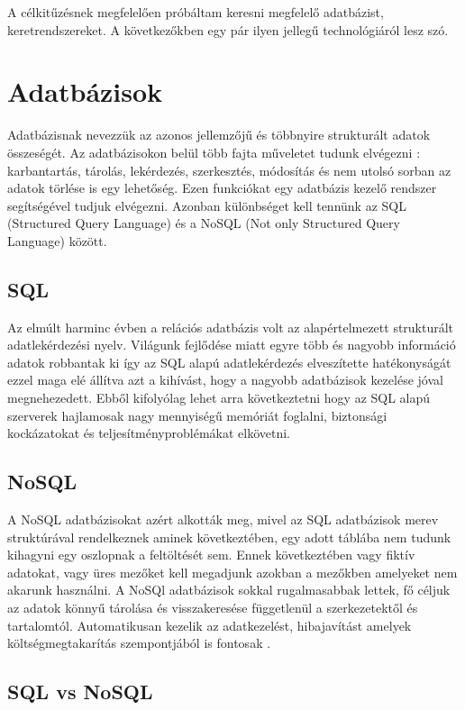A célkitűzésnek megfelelően próbáltam keresni megfelelő adatbázist, keretrendszereket. A következőkben egy pár ilyen jellegű technológiáról lesz szó.
\section{Adatbázisok}
Adatbázisnak nevezzük az azonos jellemzőjű és többnyire strukturált adatok összeségét. Az adatbázisokon belül több fajta műveletet tudunk elvégezni \cite{dbms}: karbantartás, tárolás, lekérdezés, szerkesztés, módosítás és nem utolsó sorban az adatok törlése is egy lehetőség. Ezen funkciókat egy adatbázis kezelő rendszer segítségével tudjuk elvégezni. Azonban különbséget kell tennünk az SQL (Structured Query Language) és a NoSQL (Not only Structured Query Language) között.
\subsection{SQL}

Az elmúlt harminc évben a relációs adatbázis volt az alapértelmezett strukturált adatlekérdezési nyelv. Világunk fejlődése miatt egyre több és nagyobb információ adatok robbantak ki így az SQL alapú adatlekérdezés \cite{venkatraman2016sql}  elveszítette hatékonyságát ezzel maga elé állítva azt a kihívást, hogy a nagyobb adatbázisok kezelése jóval megnehezedett. Ebből kifolyólag lehet arra következtetni hogy az SQL alapú szerverek hajlamosak nagy mennyiségű memóriát foglalni, biztonsági kockázatokat és teljesítményproblémákat elkövetni.
	
\subsection{NoSQL}

A NoSQL adatbázisokat azért alkották meg, mivel az SQL adatbázisok merev struktúrával rendelkeznek aminek következtében, egy adott táblába nem tudunk kihagyni egy oszlopnak a feltöltését sem. Ennek következtében vagy fiktív adatokat, vagy üres mezőket kell megadjunk azokban a mezőkben amelyeket nem akarunk használni. A NoSQl adatbázisok sokkal rugalmasabbak lettek, fő céljuk az adatok könnyű tárolása és visszakeresése függetlenül a szerkezetektől és tartalomtól. Automatikusan kezelik az adatkezelést, hibajavítást amelyek költségmegtakarítás szempontjából is fontosak \cite{venkatraman2016sql}.
	
\subsection{SQL vs NoSQL}

